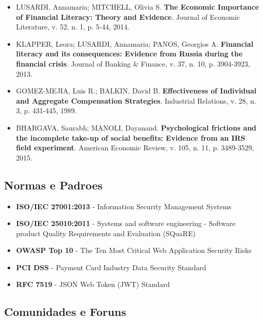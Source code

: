 \begin{itemize}
    \item LUSARDI, Annamaria; MITCHELL, Olivia S. \textbf{The Economic Importance of Financial Literacy: Theory and Evidence}. Journal of Economic Literature, v. 52, n. 1, p. 5-44, 2014.
    
    \item KLAPPER, Leora; LUSARDI, Annamaria; PANOS, Georgios A. \textbf{Financial literacy and its consequences: Evidence from Russia during the financial crisis}. Journal of Banking \& Finance, v. 37, n. 10, p. 3904-3923, 2013.
    
    \item GOMEZ-MEJIA, Luis R.; BALKIN, David B. \textbf{Effectiveness of Individual and Aggregate Compensation Strategies}. Industrial Relations, v. 28, n. 3, p. 431-445, 1989.
    
    \item BHARGAVA, Saurabh; MANOLI, Dayanand. \textbf{Psychological frictions and the incomplete take-up of social benefits: Evidence from an IRS field experiment}. American Economic Review, v. 105, n. 11, p. 3489-3529, 2015.
\end{itemize}

\subsection{Normas e Padroes}

\begin{itemize}
    \item \textbf{ISO/IEC 27001:2013} - Information Security Management Systems
    
    \item \textbf{ISO/IEC 25010:2011} - Systems and software engineering - Software product Quality Requirements and Evaluation (SQuaRE)
    
    \item \textbf{OWASP Top 10} - The Ten Most Critical Web Application Security Risks
    
    \item \textbf{PCI DSS} - Payment Card Industry Data Security Standard
    
    \item \textbf{RFC 7519} - JSON Web Token (JWT) Standard
\end{itemize}

\subsection{Comunidades e Foruns}

